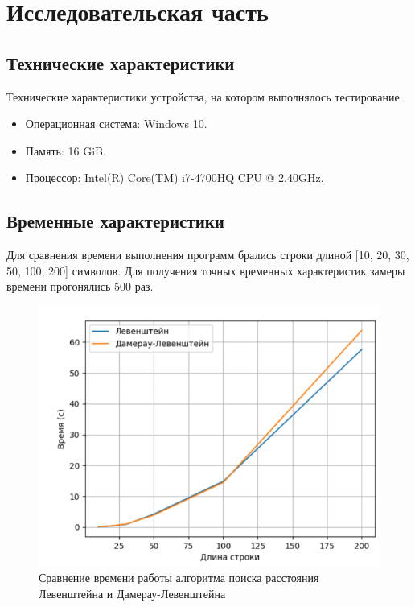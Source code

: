 \chapter{Исследовательская часть}




\section{Технические характеристики}

Технические характеристики устройства, на котором выполнялось тестирование:

\begin{itemize}
	\item Операционная система: Windows 10.
	\item Память: 16 GiB.
	\item Процессор: Intel(R) Core(TM) i7-4700HQ CPU @ 2.40GHz.
\end{itemize}


\section{Временные характеристики}

Для сравнения времени выполнения программ брались строки длиной [10, 20, 30, 50, 100, 200] символов. Для получения точных временных характеристик замеры времени прогонялись 500 раз. 

\begin{figure}[h]
    \centering
    \includegraphics[width=130mm]{inc/img/timing.png}
    \caption{Сравнение времени работы алгоритма поиска расстояния Левенштейна и Дамерау-Левенштейна}
    \label{img:timing}
\end{figure}


